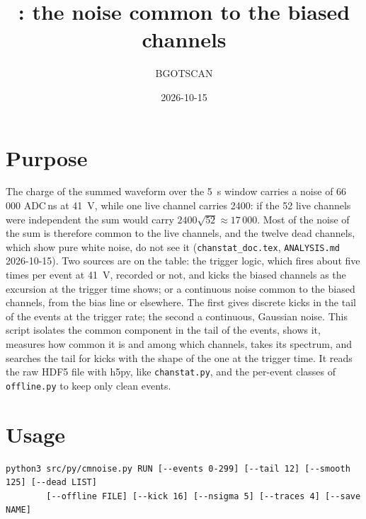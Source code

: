 \documentclass[11pt]{article}
\title{\code{cmnoise.py}: the noise common to the biased channels}
\author{BGOTSCAN}
\date{2026-10-15}
\newcommand{\code}[1]{\texttt{#1}}
\newcommand{\us}{\textmu s}
\begin{document}
\maketitle

\section{Purpose}

The charge of the summed waveform over the 5~\us{} window carries a noise
of 66\,000 ADC\,ns at 41~V, while one live channel carries 2400: if the
52 live channels were independent the sum would carry $2400\sqrt{52}
\approx 17\,000$. Most of the noise of the sum is therefore common to the
live channels, and the twelve dead channels, which show pure white noise,
do not see it (\code{chanstat\_doc.tex}, \code{ANALYSIS.md} 2026-10-15).
Two sources are on the table: the trigger logic, which fires about five
times per event at 41~V, recorded or not, and kicks the biased channels
as the excursion at the trigger time shows; or a continuous noise common
to the biased channels, from the bias line or elsewhere. The first gives
discrete kicks in the tail of the events at the trigger rate; the second
a continuous, Gaussian noise. This script isolates the common component
in the tail of the events, shows it, measures how common it is and among
which channels, takes its spectrum, and searches the tail for kicks with
the shape of the one at the trigger time. It reads the raw HDF5 file with
h5py, like \code{chanstat.py}, and the per-event classes of
\code{offline.py} to keep only clean events.

\section{Usage}

\begin{lstlisting}
python3 src/py/cmnoise.py RUN [--events 0-299] [--tail 12] [--smooth 125] [--dead LIST]
        [--offline FILE] [--kick 16] [--nsigma 5] [--traces 4] [--save NAME]
\end{lstlisting}
\end{document}
